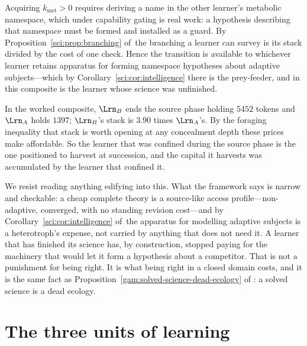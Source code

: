 \begin{corollary}\label{com:change-priced-priced-asymmetrically}
Acquiring $k_{\mathrm{met}} > 0$ requires deriving a name in the other learner's metabolic
namespace, which under capability gating is real work: a hypothesis describing that namespace
must be formed and installed as a guard. By Proposition~\ref{sci:prop:branching} of~\chSci the branching a
learner can survey is its stack divided by the cost of one check. Hence the transition is
available to whichever learner retains apparatus for forming namespace hypotheses about adaptive
subjects---which by Corollary~\ref{sci:cor:intelligence} there is the prey-feeder, and in this composite is the learner
whose science was unfinished.
\end{corollary}

In the worked composite, $\Lrn_B$ ends the source phase holding $5452$ tokens and $\Lrn_A$ holds
$1397$; $\Lrn_B$'s stack is $3.90$ times $\Lrn_A$'s. By the foraging inequality that stack is
worth opening at any concealment depth these prices make affordable. So the learner that was
confined during the source phase is the one positioned to harvest at succession, and the capital
it harvests was accumulated by the learner that confined it.

\begin{remark}\label{com:offered-as-structure-moral}
We resist reading anything edifying into this. What the framework says is narrow and checkable:
a cheap complete theory is a source-like access profile---non-adaptive, converged, with no
standing revision cost---and by Corollary~\ref{sci:cor:intelligence} of~\chSci the apparatus for modelling
adaptive subjects is a heterotroph's expense, not carried by anything that does not need it. A
learner that has finished its science has, by construction, stopped paying for the machinery that
would let it form a hypothesis about a competitor. That is not a punishment for being right. It
is what being right in a closed domain costs, and it is the same fact as Proposition~\ref{gam:solved-science-dead-ecology} of
\chGame: a solved science is a dead ecology.
\end{remark}

\section{The three units of learning}\label{com:sec:units}\label{com:S12}

